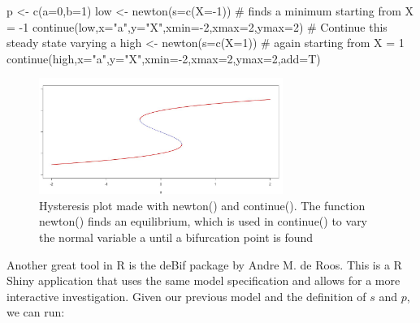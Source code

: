 \documentclass[
  letterpaper,
]{scrbook}
\newenvironment{Shaded}{\begin{snugshade}}{\end{snugshade}}
\newcommand{\AttributeTok}[1]{\textcolor[rgb]{0.40,0.45,0.13}{#1}}
\newcommand{\CommentTok}[1]{\textcolor[rgb]{0.37,0.37,0.37}{#1}}
\newcommand{\DecValTok}[1]{\textcolor[rgb]{0.68,0.00,0.00}{#1}}
\newcommand{\FunctionTok}[1]{\textcolor[rgb]{0.28,0.35,0.67}{#1}}
\newcommand{\NormalTok}[1]{\textcolor[rgb]{0.00,0.23,0.31}{#1}}
\newcommand{\OtherTok}[1]{\textcolor[rgb]{0.00,0.23,0.31}{#1}}
\newcommand{\SpecialCharTok}[1]{\textcolor[rgb]{0.37,0.37,0.37}{#1}}
\newcommand{\StringTok}[1]{\textcolor[rgb]{0.13,0.47,0.30}{#1}}
\begin{document}
\begin{Shaded}
\begin{Highlighting}[]
\NormalTok{p }\OtherTok{\textless{}{-}} \FunctionTok{c}\NormalTok{(}\AttributeTok{a=}\DecValTok{0}\NormalTok{,}\AttributeTok{b=}\DecValTok{1}\NormalTok{)}
\NormalTok{low }\OtherTok{\textless{}{-}} \FunctionTok{newton}\NormalTok{(}\AttributeTok{s=}\FunctionTok{c}\NormalTok{(}\AttributeTok{X=}\SpecialCharTok{{-}}\DecValTok{1}\NormalTok{)) }\CommentTok{\# finds a minimum starting from X = {-}1}
\FunctionTok{continue}\NormalTok{(low,}\AttributeTok{x=}\StringTok{"a"}\NormalTok{,}\AttributeTok{y=}\StringTok{"X"}\NormalTok{,}\AttributeTok{xmin=}\SpecialCharTok{{-}}\DecValTok{2}\NormalTok{,}\AttributeTok{xmax=}\DecValTok{2}\NormalTok{,}\AttributeTok{ymax=}\DecValTok{2}\NormalTok{) }\CommentTok{\# Continue this steady state varying a}
\NormalTok{high }\OtherTok{\textless{}{-}} \FunctionTok{newton}\NormalTok{(}\AttributeTok{s=}\FunctionTok{c}\NormalTok{(}\AttributeTok{X=}\DecValTok{1}\NormalTok{)) }\CommentTok{\# again starting from X = 1}
\FunctionTok{continue}\NormalTok{(high,}\AttributeTok{x=}\StringTok{"a"}\NormalTok{,}\AttributeTok{y=}\StringTok{"X"}\NormalTok{,}\AttributeTok{xmin=}\SpecialCharTok{{-}}\DecValTok{2}\NormalTok{,}\AttributeTok{xmax=}\DecValTok{2}\NormalTok{,}\AttributeTok{ymax=}\DecValTok{2}\NormalTok{,}\AttributeTok{add=}\NormalTok{T)}
\end{Highlighting}
\end{Shaded}

\begin{figure}

{\centering \includegraphics[width=3.12885in,height=\textheight]{media/ch5/image3.jpg}

}

\caption{\label{fig-ch5-img3-old-51}Hysteresis plot made with newton()
and continue(). The function newton() finds an equilibrium, which is
used in continue() to vary the normal variable a until a bifurcation
point is found}

\end{figure}

Another great tool in R is the deBif package by Andre M. de Roos. This
is a R Shiny application that uses the same model specification and
allows for a more interactive investigation. Given our previous model
and the definition of \(s\) and \(p\), we can run:
\end{document}
